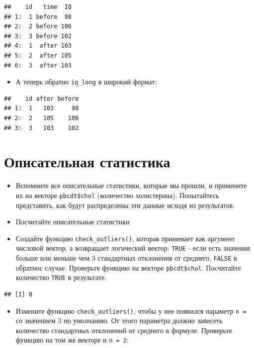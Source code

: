 \documentclass[]{book}
\providecommand{\tightlist}{%
  \setlength{\itemsep}{0pt}\setlength{\parskip}{0pt}}
\begin{document}
\begin{verbatim}
##    id   time  IQ
## 1:  1 before  98
## 2:  2 before 106
## 3:  3 before 102
## 4:  1  after 103
## 5:  2  after 105
## 6:  3  after 103
\end{verbatim}

\begin{itemize}
\tightlist
\item
  А теперь обратно \texttt{iq\_long} в широкий формат:
\end{itemize}

\begin{verbatim}
##    id after before
## 1:  1   103     98
## 2:  2   105    106
## 3:  3   103    102
\end{verbatim}

\section{Описательная статистика}\label{task_desc}

\begin{itemize}
\item
  Вспомните все описательные статистики, которые мы прошли, и примените
  их на векторе \texttt{pbcdt\$chol} (количество холистерина).
  Попытайтесь представить, как будут распределены эти данные исходя из
  результатов.
\item
  Посчитайте описательные статистики
\item
  Создайте функцию \texttt{check\_outliers()}, которая принимает как
  аргумент числовой вектор, а возвращает логический вектор:
  \texttt{TRUE} - если есть значения больше или меньше чем 3 стандартных
  отклонения от среднего, \texttt{FALSE} в обратнос случае. Проверьте
  функцию на векторе \texttt{pbcdt\$chol}. Посчитайте количество
  \texttt{TRUE} в результате.
\end{itemize}

\begin{verbatim}
## [1] 8
\end{verbatim}

\begin{itemize}
\tightlist
\item
  Измените функцию \texttt{check\_outliers()}, чтобы у нее появился
  параметр \texttt{n\ =} со значением 3 по умолчанию. От этого параметра
  должно зависеть количество стандартных отклонений от среднего в
  формуле. Проверьте функцию на том же векторе и \texttt{n\ =\ 2}:
\end{itemize}
\end{document}
